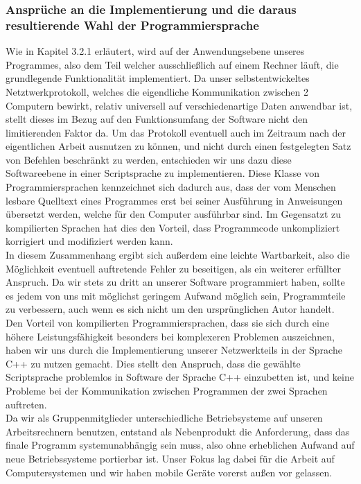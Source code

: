 \documentclass[12pt, a4paper]{scrartcl}
\begin{document}
\subsubsection{Ansprüche an die Implementierung und die daraus resultierende Wahl der Programmiersprache}
Wie in Kapitel 3.2.1 erläutert, wird auf der Anwendungsebene unseres Programmes, also dem Teil welcher ausschließlich auf einem Rechner läuft, die grundlegende Funktionalität implementiert. Da unser selbstentwickeltes Netztwerkprotokoll, welches die eigendliche Kommunikation zwischen 2 Computern bewirkt, relativ universell auf verschiedenartige Daten anwendbar ist, stellt dieses im Bezug auf den Funktionsumfang der Software nicht den limitierenden Faktor da. Um das Protokoll eventuell auch im Zeitraum nach der eigentlichen Arbeit ausnutzen zu können, und nicht durch einen festgelegten Satz von Befehlen beschränkt zu werden, entschieden wir uns dazu diese Softwareebene in einer Scriptsprache zu implementieren.
Diese Klasse von Programmiersprachen kennzeichnet sich dadurch aus, dass der vom Menschen lesbare Quelltext eines Programmes erst bei seiner Ausführung in Anweisungen übersetzt werden, welche für den Computer ausführbar sind. Im Gegensatzt zu kompilierten Sprachen hat dies den Vorteil, dass Programmcode unkompliziert korrigiert und modifiziert werden kann.\\
In diesem Zusammenhang ergibt sich außerdem eine leichte Wartbarkeit, also die Möglichkeit eventuell auftretende Fehler zu beseitigen, als ein weiterer erfüllter Anspruch. Da wir stets zu dritt an unserer Software programmiert haben, sollte es jedem von uns mit möglichst geringem Aufwand möglich sein, Programmteile zu verbessern, auch wenn es sich nicht um den ursprünglichen Autor handelt.\\
Den Vorteil von kompilierten Programmiersprachen, dass sie sich durch eine höhere Leistungsfähigkeit besonders bei komplexeren Problemen auszeichnen, haben wir uns durch die Implementierung unserer Netzwerkteils in der Sprache C++ zu nutzen gemacht. Dies stellt den Anspruch, dass die gewählte Scriptsprache problemlos in Software der Sprache C++ einzubetten ist, und keine Probleme bei der Kommunikation zwischen Programmen der zwei Sprachen auftreten.\\
Da wir als Gruppenmitglieder unterschiedliche Betriebsysteme auf unseren Arbeitsrechnern benutzen, entstand als Nebenprodukt die Anforderung, dass das finale Programm systemunabhängig sein muss, also ohne erheblichen Aufwand auf neue Betriebssysteme portierbar ist. Unser Fokus lag dabei für die Arbeit auf Computersystemen und wir haben mobile Geräte vorerst außen vor gelassen.
\end{document}
